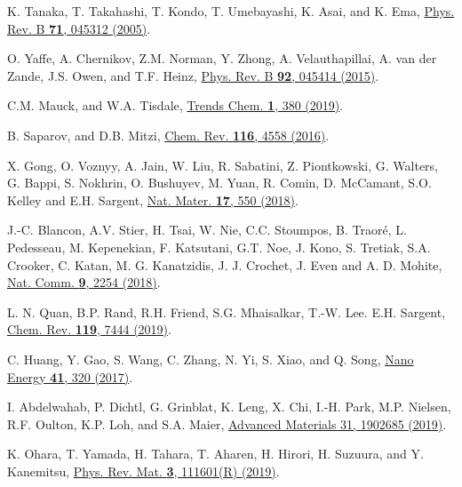 \documentclass[prb,twocolumn,preprintnumbers,superscriptaddress]{revtex4}
\begin{document}
\begin{thebibliography}{99}
 K. Tanaka, T. Takahashi, T. Kondo, T. Umebayashi, K. Asai, and K. Ema,  
\href{https://journals.aps.org/prb/abstract/10.1103/PhysRevB.71.045312}{Phys. Rev. B {\bf 71}, 045312 (2005)}.

 O. Yaffe, A. Chernikov, Z.M. Norman, Y. Zhong, A. Velauthapillai, A. van der Zande, J.S. Owen, and T.F. Heinz, 
\href{https://journals.aps.org/prb/abstract/10.1103/PhysRevB.92.045414}{Phys. Rev. B {\bf 92}, 045414 (2015)}.

 C.M. Mauck, and W.A. Tisdale,  \href{https://www.sciencedirect.com/science/article/abs/pii/S2589597419300942}{Trends Chem. {\bf 1}, 380 (2019)}.

%
 B. Saparov, and D.B. Mitzi,
\href{https://pubs.acs.org/doi/10.1021/acs.chemrev.5b00715}{Chem. Rev. {\bf 116}, 4558 (2016)}.

 X. Gong, O. Voznyy, A. Jain, W. Liu, R. Sabatini, Z. Piontkowski, G. Walters, G. Bappi, S. Nokhrin, O. Bushuyev, M. Yuan, R. Comin, D. McCamant, S.O. Kelley and E.H. Sargent,
\href{https://www.nature.com/articles/s41563-018-0081-x}{Nat. Mater. {\bf 17}, 550 (2018)}.

 J.-C. Blancon, A.V. Stier, H. Tsai, W. Nie, C.C. Stoumpos, B. Traoré, L. Pedesseau, M. Kepenekian, F. Katsutani, G.T. Noe, J. Kono, S. Tretiak, S.A. Crooker, C. Katan, M. G. Kanatzidis, J. J. Crochet, J. Even and A. D. Mohite,
\href{https://www.nature.com/articles/s41467-018-04659-x}{Nat. Comm. {\bf 9}, 2254 (2018)}.


 L. N. Quan, B.P. Rand, R.H. Friend, S.G. Mhaisalkar, T.-W. Lee. E.H. Sargent, 
\href{https://pubs.acs.org/doi/10.1021/acs.chemrev.9b00107}{Chem. Rev. {\bf 119}, 7444 (2019)}.

 C. Huang, Y. Gao, S. Wang, C. Zhang, N. Yi, S. Xiao, and Q. Song, 
\href{https://www.sciencedirect.com/science/article/pii/S2211285517305955}{Nano Energy {\bf 41}, 320 (2017)}.

 I. Abdelwahab, P. Dichtl, G. Grinblat, K. Leng, X. Chi, I.-H. Park, M.P. Nielsen, R.F. Oulton, K.P. Loh, and S.A. Maier,
\href{https://onlinelibrary.wiley.com/doi/abs/10.1002/adma.201902685}{Advanced Materials 31, 1902685 (2019)}.

 K. Ohara, T. Yamada, H. Tahara, T. Aharen, H. Hirori, H. Suzuura, and Y. Kanemitsu, \href{https://journals.aps.org/prb/abstract/10.1103/PhysRevB.103.L041201}{Phys. Rev. Mat. {\bf 3}, 111601(R) (2019)}.


\end{thebibliography}
\end{document}
